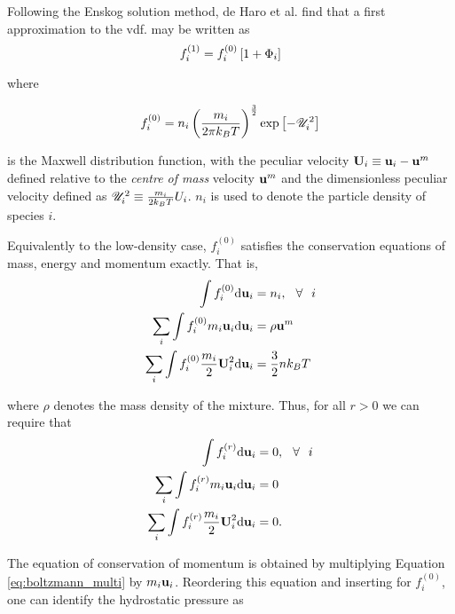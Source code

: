 Following the Enskog solution method,\cite{cohen_1} de Haro et al. find that a first approximation to the vdf. may be written as
\begin{equation}
    f_i^{(1)} = f_i^{(0)}\left[ 1 + \Phi_i \right]
\end{equation}

where 

\begin{equation}
    f_i^{(0)} = n_i \left(\frac{m_i}{2 \pi k_B T}\right)^{\frac{3}{2}} \exp \left[ - \mathscr{U}_i^2 \right]
    \label{eq:eq_vdf}
\end{equation}

is the Maxwell distribution function, with the peculiar velocity $\boldsymbol{\mathrm{U}}_i \equiv \boldsymbol{\mathrm{u}}_i - \boldsymbol{\mathrm{u}}^m$ defined relative to the \textit{centre of mass} velocity $\boldsymbol{\mathrm{u}}^m$ and the dimensionless peculiar velocity defined as $\mathscr{U}_i^2 \equiv \frac{m_i}{2 k_B T}U_i$. $n_i$ is used to denote the particle density of species $i$.

Equivalently to the low-density case, $f_i^{(0)}$ satisfies the conservation equations of mass, energy and momentum exactly. That is,
\begin{equation}
    \begin{split}
        \int f_i^{(0)} \mathrm{d} \boldsymbol{\mathrm{u}}_i &= n_i, \hspace{.25cm} \forall \hspace{.25cm} i\\
        \sum_i \int f_i^{(0)} m_i \boldsymbol{\mathrm{u}}_i \mathrm{d} \boldsymbol{\mathrm{u}}_i &= \rho \boldsymbol{\mathrm{u}}^m \\
        \sum_i \int f_i^{(0)} \frac{m_i}{2} \boldsymbol{\mathrm{U}}_i ^2 \mathrm{d} \boldsymbol{\mathrm{u}}_i &= \frac{3}{2} n k_B T
    \end{split}
\end{equation}

where $\rho$ denotes the mass density of the mixture. Thus, for all $r > 0$ we can require that
\begin{equation}
    \begin{split}
        \int f_i^{(r)} \mathrm{d} \boldsymbol{\mathrm{u}}_i &= 0, \hspace{.25cm} \forall \hspace{.25cm} i\\
        \sum_i \int f_i^{(r)} m_i \boldsymbol{\mathrm{u}}_i \mathrm{d} \boldsymbol{\mathrm{u}}_i &= 0 \\
        \sum_i \int f_i^{(r)} \frac{m_i}{2} \boldsymbol{\mathrm{U}}_i ^2 \mathrm{d} \boldsymbol{\mathrm{u}}_i &= 0.
    \end{split}
\end{equation}

The equation of conservation of momentum is obtained by multiplying Equation \eqref{eq:boltzmann_multi} by $m_i \boldsymbol{\mathrm{u}}_i$. Reordering this equation and inserting for $f_i^{(0)}$, one can identify the hydrostatic pressure as

